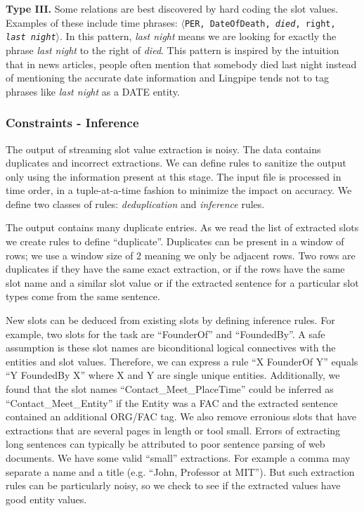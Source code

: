 \textbf{Type III.} Some relations are best discovered by hard coding the slot values. Examples of these include time phrases: $\langle$\texttt{PER, DateOfDeath, \textit{died}, right, \textit{last night}}$\rangle$. In this pattern, \textit{last night} means we are looking for exactly the phrase \textit{last night} to the right of \textit{died}. This pattern is inspired by the intuition that in news articles, people often mention that somebody died last night instead of mentioning the accurate date information and Lingpipe tends not to tag phrases like \textit{last night} as a DATE entity. 


\subsubsection{Constraints - Inference}

The output of streaming slot value extraction is noisy. The data contains duplicates and incorrect extractions. We can define rules to sanitize the output only using the information present at this stage. The input file is processed in time order, in a tuple-at-a-time fashion to minimize the impact on accuracy. We define two classes of rules: \textit{deduplication} and \textit{inference} rules.

The output contains many duplicate entries. As we read the list of extracted slots we create rules to define ``duplicate''. Duplicates can be present in a window of rows; we use a window size of 2 meaning we only be adjacent rows. Two rows are duplicates if they have the same exact extraction, or if the rows have the same slot name and a similar slot value or if the extracted sentence for a particular slot types come from the same sentence.

 New slots can be deduced from existing slots by defining inference rules. For example, two slots for the task are ``FounderOf'' and ``FoundedBy''. A safe assumption is these slot names are biconditional logical connectives with the entities and slot values. Therefore, we can express a rule ``X FounderOf Y'' equals ``Y FoundedBy X'' where X and Y are single unique entities. Additionally, we found that the slot names ``Contact\_Meet\_PlaceTime'' could be inferred as ``Contact\_Meet\_Entity'' if the Entity was a FAC and the extracted sentence contained an additional ORG/FAC tag. We also remove erronious slots that have extractions that are several pages in length or tool small. Errors of extracting long sentences can typically be 
attributed to poor sentence parsing of web documents. We have some valid ``small'' extractions. For example a comma may separate a name and a title (e.g. ``John, Professor at MIT''). But such extraction rules can be particularly noisy, so we check to see if the extracted values have good entity values.
